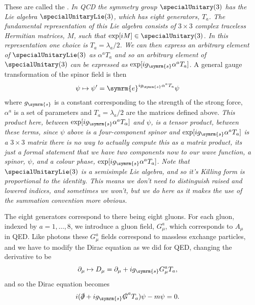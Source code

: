 \documentclass[fleqn]{NotesClass}
\newcommand{\strongCoupling}{g_{\symrm{s}}}
\newcommand{\e}{\symrm{e}}
\begin{document}
    These are called the .
    \textit{In QCD the symmetry group \(\specialUnitary(3)\) has the Lie algebra \(\specialUnitaryLie(3)\), which has eight generators, \(T_a\). The fundamental representation of this Lie algebra consists of \(3\times 3\) complex traceless Hermitian matrices, \(M\), such that \(\exp[iM] \in \specialUnitary(3)\). In this representation one choice is \(T_a = \lambda_a/2\). We can then express an arbitrary element of \(\specialUnitaryLie(3)\) as \(\alpha^aT_a\) and so an arbitrary element of \(\specialUnitary(3)\) can be expressed as \(\exp[i\strongCoupling\alpha^aT_a]\).}
    A general gauge transformation of the spinor field is then
    \begin{equation}
        \psi \mapsto \psi' = \e^{i\strongCoupling \alpha^aT_a} \psi
    \end{equation}
    where \(\strongCoupling\) is a constant corresponding to the strength of the strong force, \(\alpha^a\) is a set of parameters and \(T_a = \lambda_a/2\) are the matrices defined above.
    \textit{This product here, between \(\exp[i\strongCoupling \alpha^a T_\alpha]\) and \(\psi\), is a tensor product, between these terms, since \(\psi\) above is a four-component spinor and \(\exp[i\strongCoupling\alpha^aT_a]\) is a \(3\times 3\) matrix there is no way to actually compute this as a matrix product, its just a formal statement that we have two components now to our wave function, a spinor, \(\psi\), and a colour phase, \(\exp[i\strongCoupling\alpha^aT_a]\). Note that \(\specialUnitaryLie(3)\) is a semisimple Lie algebra, and so it's Killing form is proportional to the identity. This means we don't need to distinguish raised and lowered indices, and sometimes we won't, but we do here as it makes the use of the summation convention more obvious.}
    
    The eight generators correspond to there being eight gluons.
    For each gluon, indexed by \(a = 1, \dotsc, 8\), we introduce a gluon field, \(G^a_\mu\), which corresponds to \(A_\mu\) in QED.
    Like photons these \(G^a_\mu\) fields correspond to massless exchange particles, and we have to modify the Dirac equation as we did for QED, changing the derivative to be
    \begin{equation}
        \partial_\mu \mapsto D_\mu = \partial_\mu + i\strongCoupling G^a_\mu T_a,
    \end{equation}
    and so the Dirac equation becomes
    \begin{equation}
        i(\slashed{\partial} + i\strongCoupling\slashed{G}^aT_a)\psi - m\psi = 0.
    \end{equation}
    
\end{document}
